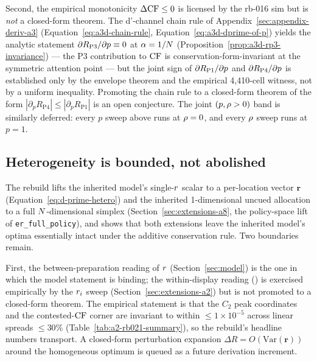Second, the empirical monotonicity $\Delta \mathrm{CF} \le 0$ is licensed by
the rb-016 sim but is \emph{not} a closed-form theorem.  The d'-channel
chain rule of
Appendix~\ref{sec:appendix-deriv-a3}
(Equation~\eqref{eq:a3d-chain-rule},
Equation~\eqref{eq:a3d-dprime-of-p}) yields the analytic statement
$\partial R_{\mathrm{P3}} / \partial p \equiv 0$ at $\alpha = 1/N$
(Proposition~\ref{prop:a3d-rp3-invariance}) — the P3 contribution to
$\mathrm{CF}$ is conservation-form-invariant at the symmetric attention
point — but the joint sign of $\partial R_{\mathrm{P1}}/\partial p$ and
$\partial R_{\mathrm{P4}}/\partial p$ is established only by the envelope
theorem and the empirical 4,410-cell witness, not by a uniform
inequality.  Promoting the chain rule to a closed-form theorem of
the form $|\partial_p R_{\mathrm{P4}}| \le |\partial_p R_{\mathrm{P1}}|$
is an open conjecture.  The joint $(p, \rho > 0)$ band is similarly
deferred: every $p$ sweep above runs at $\rho = 0$, and every
$\rho$ sweep runs at $p = 1$.

\subsection{Heterogeneity is bounded, not abolished}
\label{sec:limitations-a2-a8}

The rebuild lifts the inherited model's single-$r$ scalar to a
per-location vector $\boldsymbol{r}$
(Equation~\eqref{eq:d-prime-hetero}) and the inherited
1-dimensional uncued allocation to a full $N$-dimensional
simplex
(Section~\ref{sec:extensions-a8}, the policy-space lift of
\texttt{er\_full\_policy}), and shows that both extensions leave the
inherited model's optima essentially intact under the additive
conservation rule.  Two boundaries remain.

First, the between-preparation reading of $r$
(Section~\ref{sec:model}) is the one in which the model statement is
binding; the within-display reading
(\cite{mcadams_maunsell1999_v4_tuning,reynolds_heeger2009_normalization,carrasco2011_visual_attention_25y})
is exercised empirically by the $r_i$ sweep
(Section~\ref{sec:extensions-a2}) but is not promoted to a closed-form
theorem.  The empirical statement is that the $C_2$ peak coordinates
and the contested-$\mathrm{CF}$ corner are invariant to within $\le 1{\times}10^{-5}$
across linear spreads $\le 30\%$
(Table~\ref{tab:a2-rb021-summary}), so the rebuild's headline
numbers transport.  A closed-form perturbation expansion
$\Delta R = O(\mathrm{Var}(\boldsymbol{r}))$ around the homogeneous
optimum is queued as a future derivation increment.

